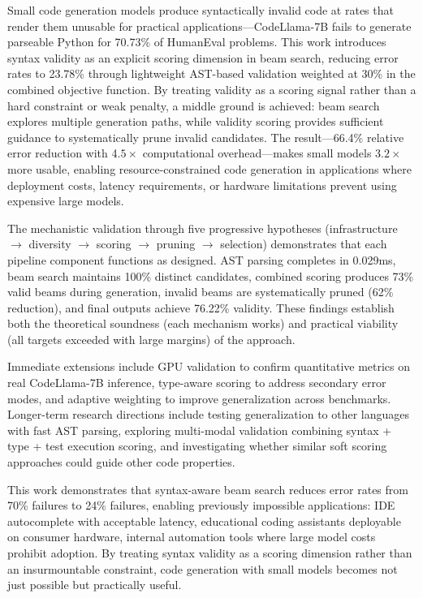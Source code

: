 
Small code generation models produce syntactically invalid code at rates that render them unusable for practical applications---CodeLlama-7B fails to generate parseable Python for 70.73\% of HumanEval problems. This work introduces syntax validity as an explicit scoring dimension in beam search, reducing error rates to 23.78\% through lightweight AST-based validation weighted at 30\% in the combined objective function. By treating validity as a scoring signal rather than a hard constraint or weak penalty, a middle ground is achieved: beam search explores multiple generation paths, while validity scoring provides sufficient guidance to systematically prune invalid candidates. The result---66.4\% relative error reduction with 4.$5\times$ computational overhead---makes small models 3.$2\times$ more usable, enabling resource-constrained code generation in applications where deployment costs, latency requirements, or hardware limitations prevent using expensive large models.

The mechanistic validation through five progressive hypotheses (infrastructure $\rightarrow$ diversity $\rightarrow$ scoring $\rightarrow$ pruning $\rightarrow$ selection) demonstrates that each pipeline component functions as designed. AST parsing completes in 0.029ms, beam search maintains 100\% distinct candidates, combined scoring produces 73\% valid beams during generation, invalid beams are systematically pruned (62\% reduction), and final outputs achieve 76.22\% validity. These findings establish both the theoretical soundness (each mechanism works) and practical viability (all targets exceeded with large margins) of the approach.

Immediate extensions include GPU validation to confirm quantitative metrics on real CodeLlama-7B inference, type-aware scoring to address secondary error modes, and adaptive weighting to improve generalization across benchmarks. Longer-term research directions include testing generalization to other languages with fast AST parsing, exploring multi-modal validation combining syntax + type + test execution scoring, and investigating whether similar soft scoring approaches could guide other code properties.

This work demonstrates that syntax-aware beam search reduces error rates from 70\% failures to 24\% failures, enabling previously impossible applications: IDE autocomplete with acceptable latency, educational coding assistants deployable on consumer hardware, internal automation tools where large model costs prohibit adoption. By treating syntax validity as a scoring dimension rather than an insurmountable constraint, code generation with small models becomes not just possible but practically useful.


